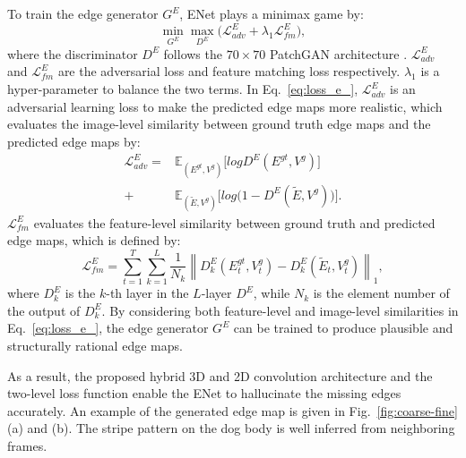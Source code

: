 To train the edge generator $G^E$, ENet plays a minimax game by:
\begin{equation}
	\label{eq:loss_e_}
	\min\limits_{G^E} \max \limits_{D^E} \big(\mathcal{L}^E_{adv}+\lambda_1 \mathcal{L}^E_{fm}\big),
\end{equation}
where the discriminator $D^E$ follows the $70\times 70$ PatchGAN architecture \cite{Isola_2017_CVPR}. 
$\mathcal{L}^E_{adv}$ and $\mathcal{L}^E_{fm}$ are the adversarial loss and feature matching loss respectively. 
$\lambda_1$ is a hyper-parameter to balance the two terms.
%
In Eq.~\eqref{eq:loss_e_}, $\mathcal{L}^E_{adv}$ is an adversarial learning loss to make the predicted edge maps more realistic, which evaluates the image-level similarity between ground truth edge maps and the predicted edge maps by:
\begin{equation} \label{eq:edge_adver}
	\begin{aligned} 
		\mathcal{L}^E_{adv}  =&\mathbb{E}_{({E}^{gt},{V}^{g})}\big[logD^E({E}^{gt},{V}^{g})\big]\\ 
		+&\mathbb{E}_{({\widetilde{E}},{V}^{g})}\big[log\big(1-D^E ( {\widetilde{E}},{V}^{g})\big)\big].
	\end{aligned}
\end{equation}
% 
$\mathcal{L}^E_{fm}$ evaluates the feature-level similarity between ground truth and predicted edge maps, which is defined by:
\begin{equation}
	\label{eq:edge_fm}
	\mathcal{L}^E_{fm}=\sum_{t=1}^T\sum_{k=1}^L{\frac{1}{N_k}\left\| D^E_k({E}_t^{gt},{V}_t^{g})- D^E_k({\widetilde{E}_t},{V}_t^{g})\right\|_1},
\end{equation}
where $D^E_k$ is the $k$-th layer in the $L$-layer $D^E$, while $N_k$ is the element number of the output of $D^E_k$.
By considering both feature-level and image-level similarities in Eq.~\eqref{eq:loss_e_}, the edge generator $G^E$ can be trained to produce plausible and structurally rational edge maps.

As a result, the proposed hybrid 3D and 2D convolution architecture and the two-level loss function enable the ENet to hallucinate the missing edges accurately.
An example of the generated edge map is given in Fig.~\ref{fig:coarse-fine} (a) and (b). 
The stripe pattern on the dog body is well inferred from neighboring frames. 


